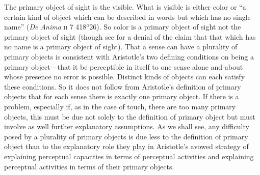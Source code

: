 The primary object of sight is the visible. What is visible is either color or ``a certain kind of object which can be described in words but which has no single name'' (\emph{De Anima} \textsc{ii} 7 418\( ^{a} \)26). So color is a primary object of sight not the primary object of sight (though see \citealt[252]{Polansky:2007ly} for a denial of the claim that that which has no name is a primary object of sight). That a sense can have a plurality of primary objects is consistent with Aristotle's two defining conditions on being a primary object---that it be perceptible in itself to one sense alone and about whose presence no error is possible. Distinct kinds of objects can each satisfy these conditions. So it does not follow from Aristotle's definition of primary objects that for each sense there is exactly one primary object. If there is a problem, especially if, as in the case of touch, there are too many primary objects, this must be due not solely to the definition of primary object but must involve as well further explanatory assumptions. As we shall see, any difficulty posed by a plurality of primary objects is due less to the definition of primary object than to the explanatory role they play in Aristotle's avowed strategy of explaining perceptual capacities in terms of perceptual activities and explaining perceptual activities in terms of their primary objects.

